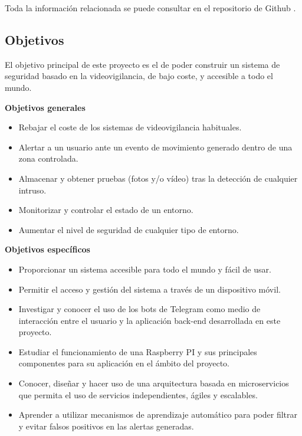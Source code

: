 Toda la información relacionada se puede consultar en el repositorio de Github \cite{ref1}.

\subsection{Objetivos}

El objetivo principal de este proyecto es el de poder construir un sistema de seguridad basado en la videovigilancia, de bajo coste, y accesible a todo el mundo.

\textbf{Objetivos generales}

\vspace{-0.3cm}

\begin{itemize}
	\item Rebajar el coste de los sistemas de videovigilancia habituales.
	\item Alertar a un usuario ante un evento de movimiento generado dentro de una zona controlada.
	\item Almacenar y obtener pruebas (fotos y/o vídeo) tras la detección de cualquier intruso.
	\item Monitorizar y controlar el estado de un entorno.
	\item Aumentar el nivel de seguridad de cualquier tipo de entorno.	
\end{itemize}

\textbf{Objetivos específicos}

\vspace{-0.3cm}

\begin{itemize}
	\item Proporcionar un sistema accesible para todo el mundo y fácil de usar.
	\item Permitir el acceso y gestión del sistema a través de un dispositivo móvil.
	\item Investigar y conocer el uso de los bots de Telegram como medio de interacción entre el usuario y la aplicación back-end desarrollada en este proyecto.
	\item Estudiar el funcionamiento de una Raspberry PI y sus principales componentes para su aplicación en el ámbito del proyecto.
	\item Conocer, diseñar y hacer uso de una arquitectura basada en microservicios que permita el uso de servicios independientes, ágiles y escalables.
	\item Aprender a utilizar mecanismos de aprendizaje automático para poder filtrar y evitar falsos positivos en las alertas generadas.

\end{itemize}

